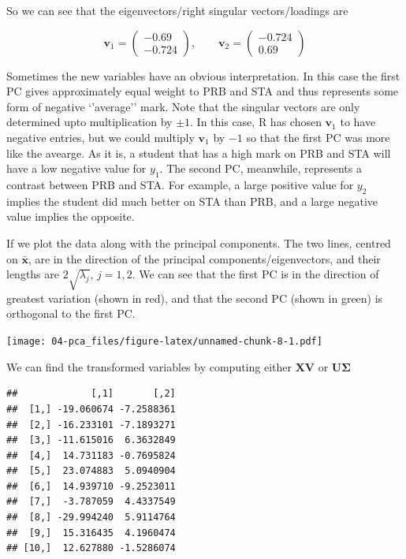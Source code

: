 \documentclass[]{book}
\newenvironment{Shaded}{\begin{snugshade}}{\end{snugshade}}
\newcommand{\NormalTok}[1]{#1}
\newcommand{\OperatorTok}[1]{\textcolor[rgb]{0.81,0.36,0.00}{\textbf{#1}}}
\newcommand{\StringTok}[1]{\textcolor[rgb]{0.31,0.60,0.02}{#1}}
\theoremstyle{definition}
\theoremstyle{definition}
\theoremstyle{definition}
\theoremstyle{remark}
\begin{document}
So we can see that the eigenvectors/right singular vectors/loadings are

\[\boldsymbol v_1=\begin{pmatrix} -0.69 \\ -0.724 \end{pmatrix},\qquad \boldsymbol v_2=\begin{pmatrix} -0.724 \\ 0.69 \end{pmatrix}\]

Sometimes the new variables have an obvious interpretation. In this case the first PC gives approximately equal weight to PRB and STA and thus represents some form of negative `'average'' mark. Note that the singular vectors are only determined upto multiplication by \(\pm 1\). In this case, R has chosen \(\boldsymbol v_1\) to have negative entries, but we could multiply \(\boldsymbol v_1\) by \(-1\) so that the first PC was more like the avearge.
As it is, a student that has a high mark on PRB and STA will have a low negative value for \(y_1\). The second PC, meanwhile, represents a contrast between PRB and STA. For example, a large positive value for \(y_2\) implies the student did much better on STA than PRB, and a large negative value implies the opposite.

If we plot the data along with the principal components. The two lines, centred on \(\bar{\boldsymbol x}\), are in the direction of the principal components/eigenvectors, and their lengths are \(2 \sqrt{\lambda_j}\), \(j=1,2\).
We can see that the first PC is in the direction of greatest variation (shown in red), and that the second PC (shown in green) is orthogonal to the first PC.

\texttt{[image: 04-pca\_files/figure-latex/unnamed-chunk-8-1.pdf]}

We can find the transformed variables by computing either \(\boldsymbol X\boldsymbol V\) or \(\boldsymbol U\boldsymbol \Sigma\)

\begin{Shaded}
\end{Shaded}

\begin{verbatim}
##             [,1]       [,2]
##  [1,] -19.060674 -7.2588361
##  [2,] -16.233101 -7.1893271
##  [3,] -11.615016  6.3632849
##  [4,]  14.731183 -0.7695824
##  [5,]  23.074883  5.0940904
##  [6,]  14.939710 -9.2523011
##  [7,]  -3.787059  4.4337549
##  [8,] -29.994240  5.9114764
##  [9,]  15.316435  4.1960474
## [10,]  12.627880 -1.5286074
\end{verbatim}
\end{document}
